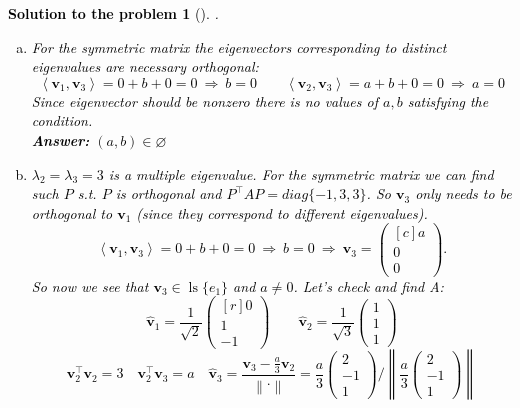 \documentclass[12pt,a4]{article}
\newtheorem{solution}{Solution to the problem}
\newcommand\ls{\operatorname{ls}}
\newcommand{\sprod}[2]{\left \langle #1, #2 \right \rangle}
\newcommand{\norm}[1]{\left\lVert#1\right\rVert}
\newcommand{\bv}{{\mathbf v}}
\newcommand{\answer}[1]{\textbf{Answer:} #1}
\begin{document}
\textcolor{black}{
\begin{solution}[]\rm .
\begin{enumerate}[(a)]
\item
For the symmetric matrix the eigenvectors corresponding to distinct eigenvalues are necessary orthogonal:
\[
\sprod{\bv_1}{\bv_3} = 0 + b + 0 = 0
~\Rightarrow~
b = 0
\qquad
\sprod{\bv_2}{\bv_3} = a + b + 0 = 0
~\Rightarrow~
a = 0
\]
Since eigenvector should be nonzero there is no values of $a,b$ satisfying the condition.\\
\answer{$(a,b) \in \varnothing$}
	\item
$\lambda_2 = \lambda_3 = 3$ is a multiple eigenvalue. For the symmetric matrix we can find such $P$ s.t. $P$ is orthogonal and $P^\top A P = diag\{-1, 3, 3\}$.
So $\bv_3$ only needs to be orthogonal to $\bv_1$ (since they correspond to different eigenvalues).
\[
\sprod{\bv_1}{\bv_3} = 0 + b + 0 = 0
~\Rightarrow~
b = 0
~\Rightarrow~
\bv_3 = \begin{pmatrix}[c] a\\ 0 \\ 0 \end{pmatrix}.
\]
So now we see that $\bv_3 \in \ls\{e_1\}$ and $a \neq 0$. Let's check and find A:
\[
\hat \bv_1 = \frac1{\sqrt2} \begin{pmatrix}[r] 0 \\ 1 \\ -1\end{pmatrix}
\qquad
\hat \bv_2 = \frac1{\sqrt3} \begin{pmatrix} 1 \\ 1 \\ 1 \end{pmatrix}
\]
\[
\bv_2^\top \bv_2 = 3
\quad
\bv_2^\top \bv_3 = a
\quad
\hat \bv_3 = \frac{\bv_3 - \frac{a}3 \bv_2}{\norm{\cdot}} = 
\frac{a}3
\begin{pmatrix} 2 \\ - 1 \\ 1 \end{pmatrix}
/\norm{\frac{a}3\begin{pmatrix} 2  \\ - 1 \\ 1  \end{pmatrix}}
\]
\end{enumerate}
\end{solution}}
\end{document}
